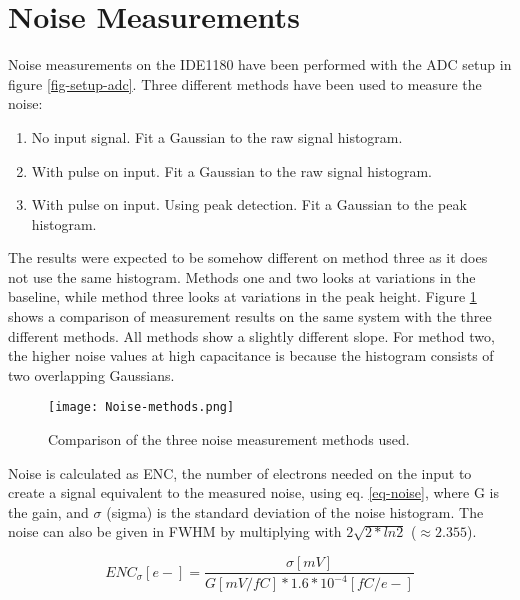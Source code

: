 \documentclass[../main/thesis.tex]{subfiles}
\begin{document}
\section{Noise Measurements}
\label{ide-noise}

Noise measurements on the IDE1180 have been performed with the ADC setup in figure \ref{fig-setup-adc}. Three different methods have been used to measure the noise:
\begin{enumerate}  
	\item No input signal. Fit a Gaussian to the raw signal histogram. 
	\item With pulse on input. Fit a Gaussian to the raw signal histogram.  
	\item With pulse on input. Using peak detection. Fit a Gaussian to the peak histogram.   
\end{enumerate}

The results were expected to be somehow different on method three as it does not use the same histogram. Methods one and two looks at variations in the baseline, while method three looks at variations in the peak height. Figure \ref{fig-noise-methods} shows a comparison of measurement results on the same system with the three different methods. All methods show a slightly different slope. For method two, the higher noise values at high capacitance is because the histogram consists of two overlapping Gaussians.  %

\begin{figure}%
	\centering
	\texttt{[image: Noise-methods.png]}
	\caption{Comparison of the three noise measurement methods used.}
	\label{fig-noise-methods}
\end{figure} 

Noise is calculated as \acrfull{ENC}, the number of electrons needed on the input to create a signal equivalent to the measured noise, using eq. \ref{eq-noise}, where G is the gain, and $\sigma$ (sigma) is the standard deviation of the noise histogram. The noise can also be given in \gls{FWHM} by multiplying with $2\sqrt{2*ln2}$ ($\approx 2.355$). 

\begin{equation}%
ENC_\sigma [e-] = \frac{\sigma [mV]}{G [mV/fC]*1.6*10^{-4} [fC/e-]}
\label{eq-noise}
\end{equation}
\end{document}
